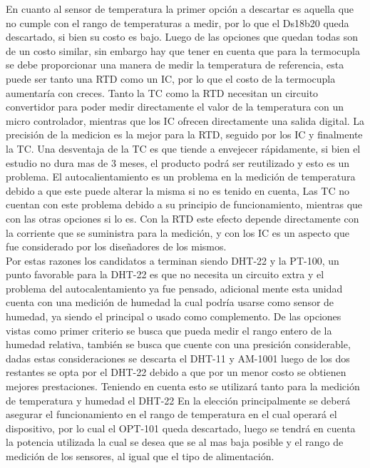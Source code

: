 En cuanto al sensor de temperatura la primer opción a descartar es aquella que no cumple con el rango de temperaturas a medir, por lo que el Ds18b20 queda descartado, si bien su costo es bajo. Luego de las opciones que quedan todas son de un costo similar, sin embargo hay que tener en cuenta que para la termocupla se debe proporcionar una manera de medir la temperatura de referencia, esta puede ser tanto una RTD como un IC, por lo que el costo de la termocupla aumentaría con creces. Tanto la TC como la RTD necesitan un circuito convertidor para poder medir directamente el valor de la temperatura con un micro controlador, mientras que los IC ofrecen directamente una salida digital. La precisión de la medicion es la mejor para la RTD, seguido por los IC y finalmente la TC. Una desventaja de la TC es que tiende a envejecer rápidamente, si bien el estudio no dura mas de 3 meses, el producto podrá ser reutilizado y esto es un problema. El autocalientamiento es un problema en la medición de temperatura debido a que este puede alterar la misma si no es tenido en cuenta, Las TC no cuentan con este problema debido a su principio de funcionamiento, mientras que con las otras opciones si lo es. Con la RTD este efecto depende directamente con la corriente que se suministra para la medición, y con los IC es un aspecto que fue considerado por los diseñadores de los mismos.\\
Por estas razones los candidatos a terminan siendo DHT-22 y la PT-100, un punto favorable para la DHT-22 es que no necesita un circuito extra y el problema del autocalentamiento ya fue pensado, adicional mente esta unidad cuenta con una medición de humedad la cual podría usarse como sensor de humedad, ya siendo el principal o usado como complemento.
De las opciones vistas como primer criterio se busca que pueda medir el rango entero de la humedad relativa, también se busca que cuente con una presición considerable, dadas estas consideraciones se descarta el DHT-11 y AM-1001 luego de los dos restantes se opta por el DHT-22 debido a que por un menor costo se obtienen mejores prestaciones.
Teniendo en cuenta esto se utilizará tanto para la medición de temperatura y humedad el DHT-22
En la elección principalmente se deberá asegurar el funcionamiento en el rango de temperatura en el cual operará el dispositivo, por lo cual el OPT-101 queda descartado, luego se tendrá en cuenta la potencia utilizada la cual se desea que se al mas baja posible y el rango de medición de los sensores, al igual que el tipo de alimentación.

